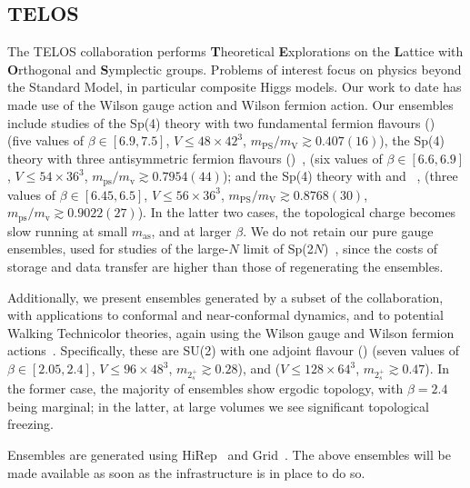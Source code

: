 \documentclass[a4paper,11pt]{article}
\begin{document}
\subsection{TELOS}

The TELOS collaboration performs
\textbf{T}heoretical \textbf{E}xplorations on the \textbf{L}attice
with \textbf{O}rthogonal and \textbf{S}ymplectic groups.
Problems of interest focus on physics beyond the Standard Model,
in particular composite Higgs models.
Our work to date has made use of
the Wilson gauge action and Wilson fermion action.
Our ensembles include studies of
the Sp(4) theory with two fundamental fermion flavours
()~\cite{Bennett:2019jzz}
(five values of $\beta\in[6.9,7.5]$,
$V \le 48\times42^{3}$,
$m_{\mathrm{PS}}/m_{\mathrm{V}} \gtrsim 0.407(16)$),
the Sp(4) theory with three antisymmetric fermion flavours
()~\cite{Hsiao:2022gju},
(six values of $\beta\in[6.6,6.9]$,
$V \le 54\times36^{3}$,
$m_{\mathrm{ps}}/m_{\mathrm{v}} \gtrsim 0.7954(44)$);
and the Sp(4) theory with  and ~\cite{Bennett:2022yfa},
(three values of $\beta\in[6.45,6.5]$,
$V \le 56\times36^{3}$,
$m_{\mathrm{PS}}/m_{\mathrm{V}} \gtrsim 0.8768(30)$,
$m_{\mathrm{ps}}/m_{\mathrm{v}} \gtrsim 0.9022(27)$).
In the latter two cases,
the topological charge becomes slow running at small $m_{\mathrm{as}}$,
and at larger $\beta$.
We do not retain our pure gauge ensembles,
used for studies of the large-$N$ limit of Sp(2$N$)~\cite{Bennett:2023qwx,Bennett:2022gdz,Bennett:2020qtj},
since the costs of storage and data transfer are
higher than those of regenerating the ensembles.

Additionally,
we present ensembles generated by a subset of the collaboration,
with applications to conformal and near-conformal dynamics,
and to potential Walking Technicolor theories,
again using the Wilson gauge and Wilson fermion actions~\cite{Athenodorou:2024rba}.
Specifically,
these are SU(2) with one adjoint flavour ()
(seven values of $\beta\in[2.05,2.4]$,
$V \le 96\times48^{3}$,
$m_{2^{+}_{s}} \gtrsim 0.28$),
and 
($V \le 128\times64^{3}$,
$m_{2^{+}_{s}} \gtrsim 0.47$).
In the former case,
the majority of ensembles show ergodic topology,
with $\beta=2.4$ being marginal;
in the latter,
at large volumes we see significant topological freezing.

Ensembles are generated using
HiRep~\cite{Bennett:2019cxd,DelDebbio:2008zf}
and Grid~\cite{Bennett:2023gbe,Yamaguchi:2022feu}.
The above ensembles will be made available
as soon as the infrastructure is in place to do so.
\end{document}
